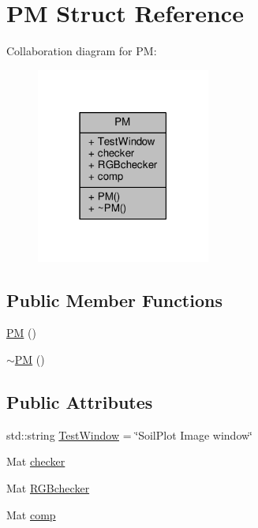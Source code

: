 \hypertarget{struct_p_m}{}\section{P\+M Struct Reference}
\label{struct_p_m}


Collaboration diagram for P\+M\+:\nopagebreak
\begin{figure}[H]
\begin{center}
\leavevmode
\includegraphics[width=162pt]{struct_p_m__coll__graph}
\end{center}
\end{figure}
\subsection*{Public Member Functions}
\begin{DoxyCompactItemize}
\item 
\hyperlink{struct_p_m_ae343317fc853de250cca312180eb303f}{P\+M} ()
\item 
\hyperlink{struct_p_m_ac8220e4a7190ef4683a6827de44cefb1}{$\sim$\+P\+M} ()
\end{DoxyCompactItemize}
\subsection*{Public Attributes}
\begin{DoxyCompactItemize}
\item 
std\+::string \hyperlink{struct_p_m_a2141a6fa1189cc201abe78a3a8613bd9}{Test\+Window} = \char`\"{}Soil\+Plot Image window\char`\"{}
\item 
Mat \hyperlink{struct_p_m_ae661c05678d510d3bc4a5ed7ddb4bac8}{checker}
\item 
Mat \hyperlink{struct_p_m_a536041e64b62e33d2136365842f32d95}{R\+G\+Bchecker}
\item 
Mat \hyperlink{struct_p_m_aa5501daf13cddde4c540ce70e5d378ca}{comp}
\end{DoxyCompactItemize}


